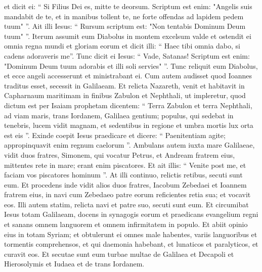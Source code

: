 \begin{biblechapter}
\begin{biblechapter}
\begin{biblechapter}
\begin{biblechapter}
\verse et dicit ei: “ Si Filius Dei es, mitte te deorsum. Scriptum est enim:
 "Angelis suis mandabit de te,
 et in manibus tollent te,
 ne forte offendas ad lapidem pedem tuum" ”.
 \verse Ait illi Iesus: “ Rursum scriptum est: "Non tentabis Dominum Deum tuum" ”.
 \verse Iterum assumit eum Diabolus in montem excelsum valde et ostendit ei omnia regna mundi et gloriam eorum 
\verse et dicit illi: “ Haec tibi omnia dabo, si cadens adoraveris me”. 
\verse Tunc dicit ei Iesus:
 “ Vade, Satanas! Scriptum est enim:
 "Dominum Deum tuum adorabis
 et illi soli servies" ”.
 \verse Tunc reliquit eum Diabolus, et ecce angeli accesserunt et ministrabant ei.
 \verse Cum autem audisset quod Ioannes traditus esset, secessit in Galilaeam. 
\verse Et relicta Nazareth, venit et habitavit in Capharnaum maritimam 
\verse in finibus Zabulon et Nephthali, ut impleretur, quod dictum est per Isaiam prophetam dicentem:
 \verse “ Terra Zabulon et terra Nephthali,
 ad viam maris, trans Iordanem,
 Galilaea gentium;
 \verse populus, qui sedebat in tenebris,
 lucem vidit magnam,
 et sedentibus in regione et umbra mortis
 lux orta est eis ”.
 \verse Exinde coepit Iesus praedicare et dicere: “ Paenitentiam agite; appropinquavit enim regnum caelorum ”.
 \verse Ambulans autem iuxta mare Galilaeae, vidit duos fratres, Simonem, qui vocatur Petrus, et Andream fratrem eius, mittentes rete in mare; erant enim piscatores. 
\verse Et ait illis: “ Venite post me, et faciam vos piscatores hominum ”. 
 \verse At illi continuo, relictis retibus, secuti sunt eum.
 \verse Et procedens inde vidit alios duos fratres, Iacobum Zebedaei et Ioannem fratrem eius, in navi cum Zebedaeo patre eorum reficientes retia sua; et vocavit eos. 
\verse Illi autem statim, relicta navi et patre suo, secuti sunt eum.
 \verse Et circumibat Iesus totam Galilaeam, docens in synagogis eorum et praedicans evangelium regni et sanans omnem languorem et omnem infirmitatem in populo. 
 \verse Et abiit opinio eius in totam Syriam; et obtulerunt ei omnes male habentes, variis languoribus et tormentis comprehensos, et qui daemonia habebant, et lunaticos et paralyticos, et curavit eos. 
\verse Et secutae sunt eum turbae multae de Galilaea et Decapoli et Hierosolymis et Iudaea et de trans Iordanem.
 

\end{biblechapter}
\end{biblechapter}
\end{biblechapter}
\end{biblechapter}
